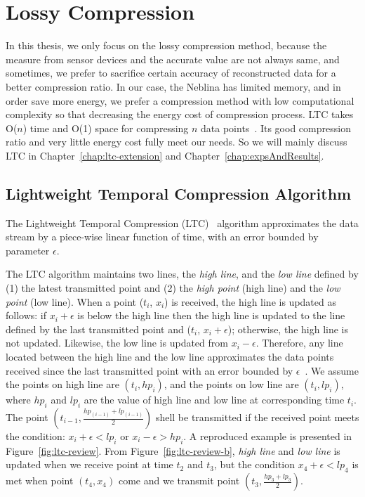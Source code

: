 \section{Lossy Compression}


In this thesis, we only focus on the lossy compression method, because the
measure from sensor devices and the accurate value are not always same, and
sometimes, we prefer to sacrifice certain accuracy of reconstructed data for a
better compression ratio. In our case, the Neblina has limited memory, and in
order save more energy, we prefer a compression method with low computational
complexity so that decreasing the energy cost of compression process. LTC takes
O($n$) time and O(1) space for compressing $n$ data
points~\cite{schoellhammer2004lightweight}. Its good compression ratio and very
little energy cost fully meet our needs. So we will mainly discuss LTC in
Chapter~\ref{chap:ltc-extension} and Chapter~\ref{chap:expsAndResults}.

\subsection{Lightweight Temporal Compression Algorithm}
\label{sec:ltc}

The Lightweight Temporal Compression (LTC)~\cite{schoellhammer2004lightweight}
algorithm approximates the data stream by a piece-wise linear function of time,
with an error bounded by parameter $\epsilon$.

The LTC algorithm maintains two lines, the \emph{high line}, and the \emph{low
line} defined by (1) the latest transmitted point and (2) the \emph{high point}
(high line) and the \emph{low point} (low line). When a point ($t_i$, $x_i$) is
received, the high line is updated as follows: if $x_i+\epsilon$ is below the
high line then the high line is updated to the line defined by the last
transmitted point and ($t_i$, $x_i+\epsilon$); otherwise, the high line is not
updated. Likewise, the low line is updated from $x_i-\epsilon$. Therefore, any
line located between the high line and the low line approximates the data points
received since the last transmitted point with an error bounded by
$\epsilon$~\cite{schoellhammer2004lightweight}. We assume the points on high
line are $(t_i, hp_i)$, and the points on low line are $(t_i, lp_i)$, where
$hp_i$ and $lp_i$ are the value of high line and low line at corresponding time
$t_i$.
The point $(t_{i-1}, \frac{hp_{(i-1)}+lp_{(i-1)}}{2})$ shell be transmitted if the
received point meets the condition: $x_i+\epsilon < lp_{i}$ or $x_i-\epsilon >
hp_{i}$. A reproduced example is presented in Figure~\ref{fig:ltc-review}. From
Figure~\ref{fig:ltc-review-b}, \emph{high line} and \emph{low line} is updated
when we receive point at time $t_2$ and $t_3$, but the condition $x_4+\epsilon <
lp_{4}$ is met when point $(t_4, x_4)$ come and we transmit point $(t_3,
\frac{hp_{3}+lp_{3}}{2})$.

